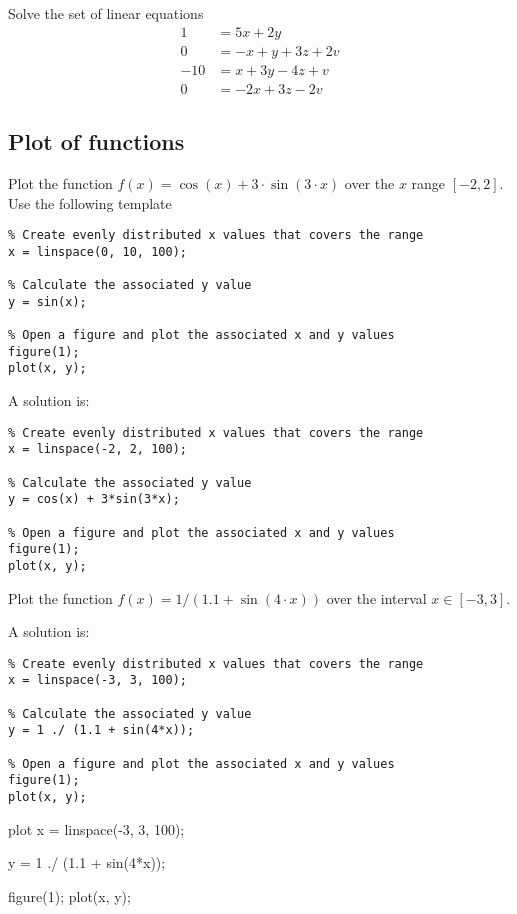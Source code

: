 \begin{ex}
Solve the set of linear equations
\begin{align*}
1	& = 5x + 2y	\\
0	& = -x + y + 3z + 2v	\\
-10 	& = x + 3y - 4z + v	\\
0	& = -2x + 3z - 2v 
\end{align*}
\end{ex}
\known{$\backslash$}




\subsection{Plot of functions}

\begin{ex}
Plot the function $f(x) = \cos(x) + 3 \cdot \sin(3 \cdot x)$
over the $x$ range $[-2, 2]$.
Use the following template 
\begin{lstlisting}
% Create evenly distributed x values that covers the range
x = linspace(0, 10, 100);

% Calculate the associated y value
y = sin(x);

% Open a figure and plot the associated x and y values
figure(1);
plot(x, y);
\end{lstlisting}
\begin{sol}
A solution is:
\begin{lstlisting}
% Create evenly distributed x values that covers the range
x = linspace(-2, 2, 100);

% Calculate the associated y value
y = cos(x) + 3*sin(3*x);

% Open a figure and plot the associated x and y values
figure(1);
plot(x, y);
\end{lstlisting}
\end{sol}
\end{ex}



\begin{ex}
Plot the function $f(x) = 1 / (1.1 + \sin(4 \cdot x))$
over the interval $x \in [-3, 3]$.
\begin{sol}
A solution is:
\begin{lstlisting}
% Create evenly distributed x values that covers the range
x = linspace(-3, 3, 100);

% Calculate the associated y value
y = 1 ./ (1.1 + sin(4*x));

% Open a figure and plot the associated x and y values
figure(1);
plot(x, y);
\end{lstlisting}
\end{sol}
\begin{solutionfile}{plot}
x = linspace(-3, 3, 100);

y = 1 ./ (1.1 + sin(4*x));

figure(1);
plot(x, y);
\end{solutionfile}
\end{ex}

